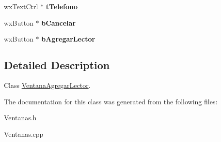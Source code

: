\begin{DoxyCompactItemize}
\item 
wx\+Text\+Ctrl $\ast$ {\bfseries t\+Telefono}\hypertarget{class_ventana_agregar_lector_ab615ccb040225be5e72495c1dcb75822}{}\label{class_ventana_agregar_lector_ab615ccb040225be5e72495c1dcb75822}

\item 
wx\+Button $\ast$ {\bfseries b\+Cancelar}\hypertarget{class_ventana_agregar_lector_a9e73416a6f984d5f2aa6776665543ee4}{}\label{class_ventana_agregar_lector_a9e73416a6f984d5f2aa6776665543ee4}

\item 
wx\+Button $\ast$ {\bfseries b\+Agregar\+Lector}\hypertarget{class_ventana_agregar_lector_a095ba7bf5353c4fbd8d9fca5df2db5aa}{}\label{class_ventana_agregar_lector_a095ba7bf5353c4fbd8d9fca5df2db5aa}

\end{DoxyCompactItemize}


\subsection{Detailed Description}
Class \hyperlink{class_ventana_agregar_lector}{Ventana\+Agregar\+Lector}. 

The documentation for this class was generated from the following files\+:\begin{DoxyCompactItemize}
\item 
Ventanas.\+h\item 
Ventanas.\+cpp\end{DoxyCompactItemize}
